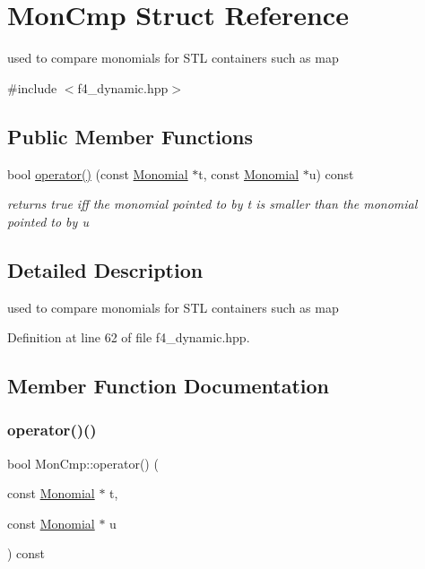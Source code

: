 \hypertarget{struct_mon_cmp}{}\section{Mon\+Cmp Struct Reference}
\label{struct_mon_cmp}


used to compare monomials for S\+TL containers such as {\ttfamily map}  




{\ttfamily \#include $<$f4\+\_\+dynamic.\+hpp$>$}

\subsection*{Public Member Functions}
\begin{DoxyCompactItemize}
\item 
bool \hyperlink{struct_mon_cmp_a2b139572e55c71442eef4b3878e1c0ed}{operator()} (const \hyperlink{group__polygroup_class_monomial}{Monomial} $\ast$t, const \hyperlink{group__polygroup_class_monomial}{Monomial} $\ast$u) const
\begin{DoxyCompactList}\small\item\em returns {\ttfamily true} iff the monomial pointed to by {\ttfamily t} is smaller than the monomial pointed to by {\ttfamily u} \end{DoxyCompactList}\end{DoxyCompactItemize}


\subsection{Detailed Description}
used to compare monomials for S\+TL containers such as {\ttfamily map} 

Definition at line 62 of file f4\+\_\+dynamic.\+hpp.



\subsection{Member Function Documentation}
\mbox{\label{struct_mon_cmp_a2b139572e55c71442eef4b3878e1c0ed}} 
\subsubsection{\texorpdfstring{operator()()}{operator()()}}
{\footnotesize\ttfamily bool Mon\+Cmp\+::operator() (\begin{DoxyParamCaption}\item[{const \hyperlink{group__polygroup_class_monomial}{Monomial} $\ast$}]{t,  }\item[{const \hyperlink{group__polygroup_class_monomial}{Monomial} $\ast$}]{u }\end{DoxyParamCaption}) const\hspace{0.3cm}{\ttfamily [inline]}}



